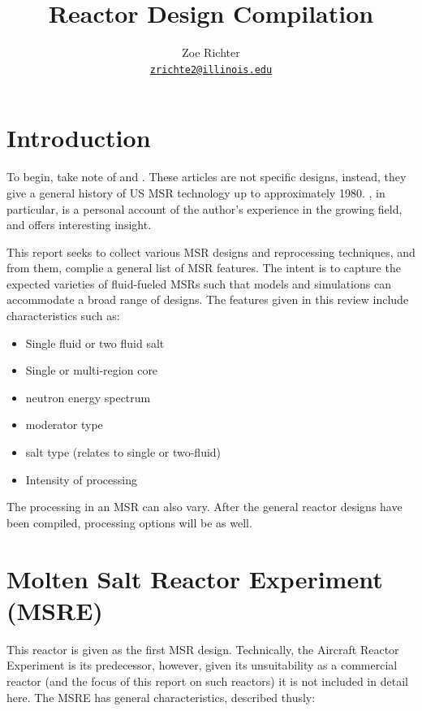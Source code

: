 \documentclass[letterpaper]{article}
\author{Zoe Richter
        \\ \href{mailto:zrichte2@illinois.edu}{\texttt{zrichte2@illinois.edu}}
}
\title{Reactor Design Compilation}
\begin{document}
\begin{titlepage}
\maketitle
\thispagestyle{empty}
\end{titlepage}

\section{Introduction}
To begin, take note of \cite{macpherson_molten_1985} and \cite{rosenthal_molten-salt_1970}.  These articles are not specific designs, instead, they give a general history of US MSR technology up to approximately 1980.  \cite{macpherson_molten_1985}, in particular, is a personal account of the author's experience in the growing field, and offers interesting insight.

This report seeks to collect various MSR designs and reprocessing techniques, and from them, complie a general list of MSR features.  The intent is to capture the expected varieties of fluid-fueled MSRs such that models and simulations can accommodate a broad range of designs.  The features given in this review include characteristics such as:

\begin{itemize}
\item Single fluid or two fluid salt
\item Single or multi-region core
\item neutron energy spectrum
\item moderator type
\item salt type (relates to single or two-fluid)
\item Intensity of processing
\end{itemize}

The processing in an MSR can also vary.  After the general reactor designs have been compiled, processing options will be as well.

\section{Molten Salt Reactor Experiment (MSRE)}
This reactor is given as the first MSR design.  Technically, the Aircraft Reactor Experiment is its predecessor, however, given its unsuitability as a commercial reactor (and the focus of this report on such reactors) it is not included in detail here.  The MSRE has general characteristics, described thusly: \cite{robertson_msre_1965}
\end{document}
